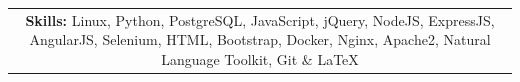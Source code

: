 \documentclass[letterpaper,11pt]{article}
\makeatletter
\newcommand{\resheading}[1]{{\Large {\textbf{#1 \vphantom{p\^{E}}}}}}
\newcommand{\ressubheading}[4]{
\begin{tabular*}{6.75in}{l@{\extracolsep{\fill}}r}
		\textbf{#1} & #2 \\
		\textit{#3} & \textit{#4} \\
\end{tabular*}\vspace{-6pt}}
\makeatother
\begin{document}

\setlength\tabcolsep{.15in}



\begin{table}[ht]
\begin{center}
\begin{tabular}
{ c  }

    \parbox[t]{4.5in}{%
	\textbf{\large Skills:} Linux, Python, PostgreSQL, JavaScript, jQuery, NodeJS, ExpressJS, AngularJS, Selenium, HTML, Bootstrap, Docker, Nginx, Apache2, Natural Language Toolkit, Git \& \LaTeX\\
    }%

%


\end{tabular}
\end{center}
\end{table}






\vspace{-1cm}




%
\end{document}
